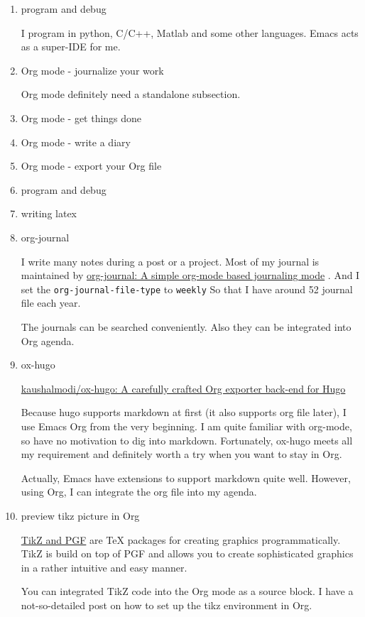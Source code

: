 \documentclass[koma,a4paper,utopia,10pt,listings-color,microtype,paralist,colorlinks]{org-article}
\begin{document}
\begin{enumerate}
\item program and debug
\label{sec:orgd2ab070}


I program in python, C/C++, Matlab and some other languages. Emacs acts as a
super-IDE for me.


\item Org mode - journalize your work
\label{sec:org75ff6e1}


Org mode definitely need a standalone subsection.

\item Org mode - get things done
\label{sec:org4df4183}



\item Org mode - write a diary
\label{sec:org266bdcc}

\item Org mode - export your Org file
\label{sec:orge9ee370}


\item program and debug
\label{sec:orgcf10226}


\item writing latex
\label{sec:org69631c2}
\item org-journal
\label{sec:org06a8ebe}


I write many notes during a post or a project. Most of my journal is maintained
by \href{https://github.com/bastibe/org-journal}{org-journal: A simple org-mode based journaling mode} . And I set the
\texttt{org-journal-file-type} to \texttt{weekly} So that I have around 52 journal file each
year.

The journals can be searched conveniently. Also they can be integrated into Org
agenda.


\item ox-hugo
\label{sec:orgde97df4}


\href{https://github.com/kaushalmodi/ox-hugo}{kaushalmodi/ox-hugo: A carefully crafted Org exporter back-end for Hugo}

Because hugo supports markdown at first (it also supports org file later), I use
Emacs Org from the very beginning. I am quite familiar with org-mode, so have no
motivation to dig into markdown. Fortunately, ox-hugo meets all my requirement
and definitely worth a try when you want to stay in Org.

Actually, Emacs have extensions to support markdown quite well. However, using
Org, I can integrate the org file into my agenda.


\item preview tikz picture in Org
\label{sec:org2bcb08b}


\href{http://www.texample.net/tikz/}{TikZ and PGF} are \TeX{} packages for creating graphics programmatically. TikZ is
build on top of PGF and allows you to create sophisticated graphics in a rather
intuitive and easy manner.

You can integrated TikZ code into the Org mode as a source block. I have a
not-so-detailed post on how to set up the tikz environment in Org.
\end{enumerate}
\end{document}
